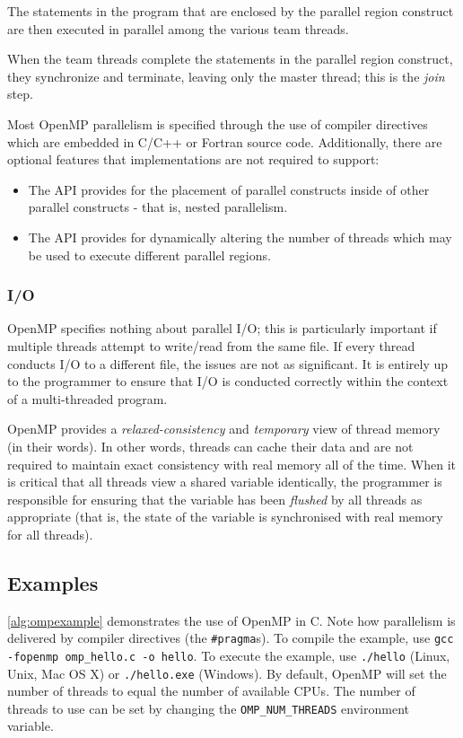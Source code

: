 The statements in the program that are enclosed by the parallel region construct are then executed in parallel among the various team threads.

When the team threads complete the statements in the parallel region construct, they synchronize and terminate, leaving only the master thread; this is the \textit{join} step.

Most OpenMP parallelism is specified through the use of compiler directives which are embedded in C/C++ or Fortran source code. Additionally, there are optional features that implementations are not required to support: \begin{itemize}
\item The API provides for the placement of parallel constructs inside of other parallel constructs - that is, nested parallelism.
\item The API provides for dynamically altering the number of threads which may be used to execute different parallel regions.
\end{itemize}

\subsubsection{I/O}
OpenMP specifies nothing about parallel I/O; this is particularly important if multiple threads attempt to write/read from the same file. If every thread conducts I/O to a different file, the issues are not as significant. It is entirely up to the programmer to ensure that I/O is conducted correctly within the context of a multi-threaded program.

OpenMP provides a \textit{relaxed-consistency} and \textit{temporary} view of thread memory (in their words). In other words, threads can cache their data and are not required to maintain exact consistency with real memory all of the time. When it is critical that all threads view a shared variable identically, the programmer is responsible for ensuring that the variable has been \textit{flushed} by all threads as appropriate (that is, the state of the variable is synchronised with real memory for all threads).

\subsection{Examples}
\autoref{alg:ompexample} demonstrates the use of OpenMP in C. Note how parallelism is delivered by compiler directives (the \texttt{\#pragma}s).
To compile the example, use \texttt{gcc -fopenmp omp\_hello.c -o hello}. To execute the example, use \texttt{./hello} (Linux, Unix, Mac OS X) or \texttt{./hello.exe} (Windows). By default, OpenMP will set the number of threads to equal the number of available CPUs. The number of threads to use can be set by changing the \texttt{OMP\_NUM\_THREADS} environment variable.

